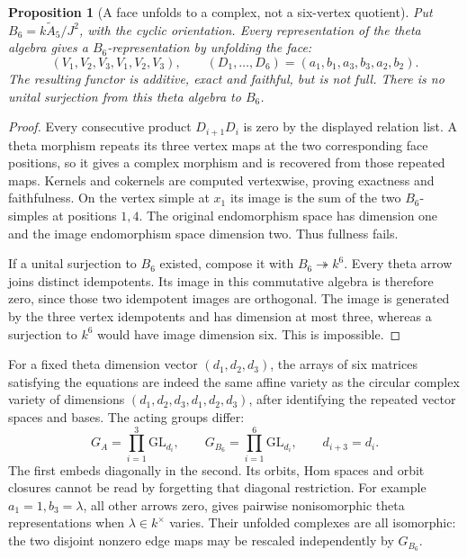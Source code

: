 \documentclass[11pt,oneside,openany]{book}
\newtheorem{proposition}[theorem]{Proposition}
\theoremstyle{definition}\newtheorem{definition}[theorem]{Definition}
\theoremstyle{remark}\newtheorem{remark}[theorem]{Remark}
\begin{document}
\begin{proposition}[A face unfolds to a complex, not a six-vertex quotient]
\label{arb:unfold}
Put $B_6=k\widetilde A_5/J^2$, with the cyclic orientation. Every representation
of the theta algebra gives a $B_6$-representation by unfolding the face:
\[
 (V_1,V_2,V_3,V_1,V_2,V_3),\qquad
 (D_1,\ldots,D_6)=(a_1,b_1,a_3,b_3,a_2,b_2).
\]
The resulting functor is additive, exact and faithful, but is not full. There is
no unital surjection from this theta algebra to $B_6$.
\end{proposition}
\begin{proof}
Every consecutive product $D_{i+1}D_i$ is zero by the displayed relation list.
A theta morphism repeats its three vertex maps at the two corresponding face
positions, so it gives a complex morphism and is recovered from those repeated
maps. Kernels and cokernels are computed vertexwise, proving exactness and
faithfulness. On the vertex simple at $x_1$ its image is the sum of the two
$B_6$-simples at positions $1,4$. The original endomorphism space has dimension
one and the image endomorphism space dimension two. Thus fullness fails.

If a unital surjection to $B_6$ existed, compose it with
$B_6\twoheadrightarrow k^6$. Every theta arrow joins distinct idempotents.
Its image in this commutative algebra is therefore zero, since those two
idempotent images are orthogonal. The image is generated by the three vertex
idempotents and has dimension at most three, whereas a surjection to $k^6$
would have image dimension six. This is impossible.
\end{proof}

For a fixed theta dimension vector $(d_1,d_2,d_3)$, the arrays of six matrices
satisfying the equations are indeed the same affine variety as the circular
complex variety of dimensions $(d_1,d_2,d_3,d_1,d_2,d_3)$, after identifying the
repeated vector spaces and bases. The acting groups differ:
\[
 G_A=\prod_{i=1}^3\mathrm{GL}_{d_i},\qquad
 G_{B_6}=\prod_{i=1}^6\mathrm{GL}_{d_i},\qquad d_{i+3}=d_i.
\]
The first embeds diagonally in the second. Its orbits, Hom spaces and orbit
closures cannot be read by forgetting that diagonal restriction.
For example $a_1=1,b_3=\lambda$, all other arrows zero, gives pairwise
nonisomorphic theta representations when $\lambda\in k^\times$ varies.
Their unfolded complexes are all isomorphic: the two disjoint nonzero edge
maps may be rescaled independently by $G_{B_6}$.
\end{document}
